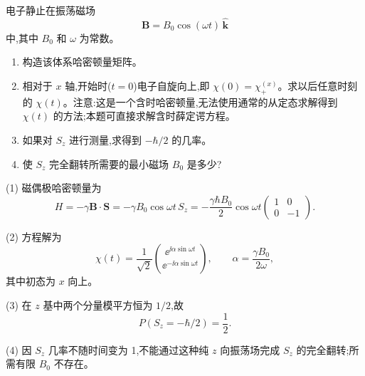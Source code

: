 \begin{question}
电子静止在振荡磁场
\[
\mathbf B=B_0\cos(\omega t)\,\hat{\mathbf k}
\]
中,其中 $B_0$ 和 $\omega$ 为常数。
\begin{enumerate}
\item 构造该体系哈密顿量矩阵。
\item 相对于 $x$ 轴,开始时($t=0$)电子自旋向上,即 $\chi(0)=\chi_+^{(x)}$。求以后任意时刻的 $\chi(t)$。注意:这是一个含时哈密顿量,无法使用通常的从定态求解得到 $\chi(t)$ 的方法;本题可直接求解含时薛定谔方程。
\item 如果对 $S_z$ 进行测量,求得到 $-\hbar/2$ 的几率。
\item 使 $S_z$ 完全翻转所需要的最小磁场 $B_0$ 是多少?
\end{enumerate}
\begin{solution}

(1) 磁偶极哈密顿量为
\[
H=-\gamma \mathbf B\cdot\mathbf S=-\gamma B_0\cos\omega t\,S_z
=-\frac{\gamma\hbar B_0}{2}\cos\omega t
\begin{pmatrix}1&0\\0&-1\end{pmatrix}.
\]

(2) 方程解为
\[
\chi(t)=\frac1{\sqrt2}\binom{\ee^{\ii\alpha\sin\omega t}}{\ee^{-\ii\alpha\sin\omega t}},
\qquad
\alpha=\frac{\gamma B_0}{2\omega},
\]
其中初态为 $x$ 向上。

(3) 在 $z$ 基中两个分量模平方恒为 $1/2$,故
\[
P(S_z=-\hbar/2)=\frac12.
\]

(4) 因 $S_z$ 几率不随时间变为 1,不能通过这种纯 $z$ 向振荡场完成 $S_z$ 的完全翻转;所需有限 $B_0$ 不存在。

\end{solution}
\end{question}

